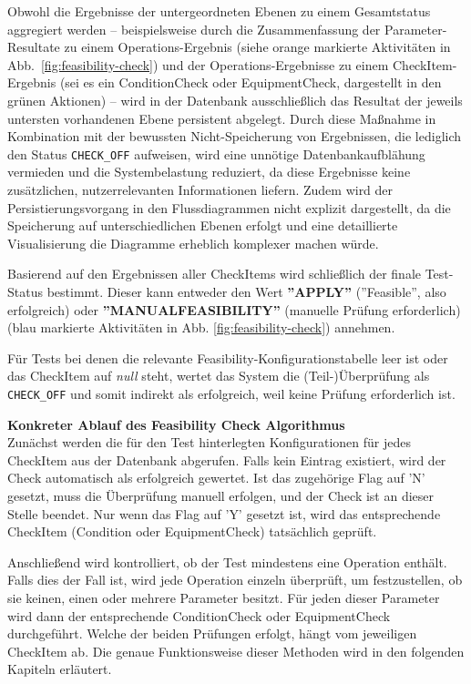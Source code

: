Obwohl die Ergebnisse der untergeordneten Ebenen zu einem Gesamtstatus aggregiert werden – beispielsweise durch die Zusammenfassung der Parameter-Resultate zu einem Operations-Ergebnis (siehe orange markierte Aktivitäten in Abb. \ref{fig:feasibility-check}) und der Operations-Ergebnisse zu einem CheckItem-Ergebnis (sei es ein \gls{ConditionCheck} oder \gls{EquipmentCheck}, dargestellt in den grünen Aktionen) – wird in der Datenbank ausschließlich das Resultat der jeweils untersten vorhandenen Ebene persistent abgelegt. Durch diese Maßnahme in Kombination mit der bewussten Nicht-Speicherung von Ergebnissen, die lediglich den Status \texttt{CHECK\_OFF} aufweisen, wird eine unnötige Datenbankaufblähung vermieden und die Systembelastung reduziert, da diese Ergebnisse keine zusätzlichen, nutzerrelevanten Informationen liefern. Zudem wird der Persistierungsvorgang in den Flussdiagrammen nicht explizit dargestellt, da die Speicherung auf unterschiedlichen Ebenen erfolgt und eine detaillierte Visualisierung die Diagramme erheblich komplexer machen würde.

Basierend auf den Ergebnissen aller CheckItems wird schließlich der finale Test-Status bestimmt. Dieser kann entweder den Wert \textbf{''APPLY''} (''Feasible'', also erfolgreich) oder \textbf{''MANUALFEASIBILITY''} (manuelle Prüfung erforderlich) (blau markierte Aktivitäten in Abb. \ref{fig:feasibility-check}) annehmen.

Für Tests bei denen die relevante Feasibility-Konfigurationstabelle leer ist oder das CheckItem auf \textit{null} steht, wertet das System die (Teil-)Überprüfung als \texttt{CHECK\_OFF} und somit indirekt als erfolgreich, weil keine Prüfung erforderlich ist.

\textbf{Konkreter Ablauf des Feasibility Check Algorithmus} \\
Zunächst werden die für den Test hinterlegten Konfigurationen für jedes CheckItem aus der Datenbank abgerufen. Falls kein Eintrag existiert, wird der Check automatisch als erfolgreich gewertet. Ist das zugehörige Flag auf 'N' gesetzt, muss die Überprüfung manuell erfolgen, und der Check ist an dieser Stelle beendet. Nur wenn das Flag auf 'Y' gesetzt ist, wird das entsprechende CheckItem (Condition oder \gls{EquipmentCheck}) tatsächlich geprüft.

Anschließend wird kontrolliert, ob der Test mindestens eine Operation enthält. Falls dies der Fall ist, wird jede Operation einzeln überprüft, um festzustellen, ob sie keinen, einen oder mehrere Parameter besitzt. Für jeden dieser Parameter wird dann der entsprechende \gls{ConditionCheck} oder \gls{EquipmentCheck} durchgeführt. Welche der beiden Prüfungen erfolgt, hängt vom jeweiligen CheckItem ab. Die genaue Funktionsweise dieser Methoden wird in den folgenden Kapiteln erläutert.

